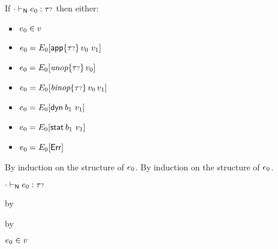 \begin{lemma}\label{H-decomposition}
  If\/ ${\cdot} \vdash_{\mathsf{N}} e_0 : {\tau{\scriptstyle ?}}$ then either:
  \begin{itemize}
    \item
      $e_0 \in v$
    \item
      $e_0 = E_0[\mathsf{app}{\{{\tau{\scriptstyle ?}}\}}\,v_0~v_1]$
    \item
      $e_0 = E_0[\textit{unop}{\{{\tau{\scriptstyle ?}}\}}\,v_0]$
    \item
      $e_0 = E_0[\textit{binop}{\{{\tau{\scriptstyle ?}}\}}\,v_0\,v_1]$
    \item
      $e_0 = E_0[\mathsf{dyn}^{}\,b_1~v_1]$
    \item
      $e_0 = E_0[\mathsf{stat}^{}\,b_1~v_1]$
    \item
      $e_0 = E_0[\mathsf{Err}]$
  \end{itemize}
\end{lemma}{
  \newcommand{\shortproof}{By induction on the structure of $\sexpr_0$.}
\begin{lamportproof*}
  \shortproof
\mainproof\leavevmode
  \shortproof

    \begin{pfproof}
      \absurdstep
        \begin{pfproof}
          ${\cdot} \vdash_{\mathsf{N}} e_0 : {\tau{\scriptstyle ?}}$
        \end{pfproof}
    \end{pfproof}

    \begin{pfproof}
      \qedstep
    \end{pfproof}

    \begin{pfproof}
        \begin{pfproof}
          \qedstep
            \begin{pfproof}
              by \pfih
            \end{pfproof}
        \end{pfproof}
        \begin{pfproof}
          \qedstep
            \begin{pfproof}
              by \pfih
            \end{pfproof}
        \end{pfproof}
        \begin{pfproof}
          \qedstep
            \begin{pfproof}
              $e_0 \in v$
            \end{pfproof}
        \end{pfproof}
    \end{pfproof}


\end{lamportproof*}}
